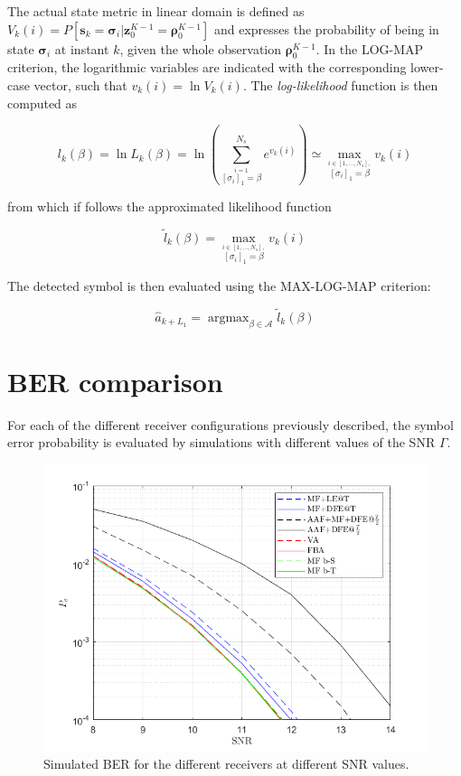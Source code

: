 \documentclass[a4paper, 12pt]{report}
\DeclareMathOperator*{\argmax}{argmax}
\begin{document}
The actual state metric in linear domain is defined as $V_k(i) = P[\mathbf{s}_k=\mathbf{\sigma}_i|\mathbf{z}^{K-1}_0=\mathbf{\rho}^{K-1}_0]$ and expresses the probability of being in state $\mathbf{\sigma}_i$ at instant $k$, given the whole observation $\mathbf{\rho}^{K-1}_0$. In the LOG-MAP criterion, the logarithmic variables are indicated with the corresponding lower-case vector, such that $v_k(i)=\ln V_k(i)$. The \textit{log-likelihood} function is then computed as

\begin{equation}
l_k(\beta) = \ln L_k(\beta) = \ln\left(\sum_{\overset{i=1}{[\sigma_i]_1=\beta}}^{N_s}e^{v_k(i)}\right)\simeq \max\limits_{\overset{i\in[1,\dots,N_s],} {[\sigma_i]_1=\beta}}v_k(i)
\end{equation}

from which if follows the approximated likelihood function

\begin{equation}
\tilde{l}_k(\beta) = \max\limits_{\overset{i\in[1,\dots,N_s],} {[\sigma_i]_1=\beta}}v_k(i)
\end{equation}

The detected symbol is then evaluated using the MAX-LOG-MAP criterion:

\begin{equation}
\hat{a}_{k+L_1} = \argmax_{\beta \in \mathcal{A}} \tilde{l}_k(\beta)
\end{equation}

\clearpage
\section*{BER comparison}
For each of the different receiver configurations previously described, the symbol error probability is evaluated by simulations with different values of the SNR $\Gamma$. 

\begin{figure}[H]
	\centering
	\includegraphics[width=15cm]{images/PevsGamma}
	\caption{Simulated BER for the different receivers at different SNR values.}\label{Pe}
\end{figure}
\end{document}
